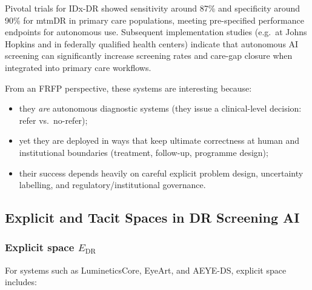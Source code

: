 Pivotal trials for IDx-DR showed sensitivity around 87\% and specificity
around 90\% for mtmDR in primary care populations, meeting pre-specified
performance endpoints for autonomous use.
Subsequent implementation studies (e.g.\ at Johns Hopkins and in federally
qualified health centers) indicate that autonomous AI screening can
significantly increase screening rates and care-gap closure when integrated
into primary care workflows.

From an FRFP perspective, these systems are interesting because:

\begin{itemize}
  \item they \emph{are} autonomous diagnostic systems (they issue a
        clinical-level decision: refer vs.\ no-refer);
  \item yet they are deployed in ways that keep ultimate correctness at
        human and institutional boundaries (treatment, follow-up, programme
        design);
  \item their success depends heavily on careful explicit problem design,
        uncertainty labelling, and regulatory/institutional governance.
\end{itemize}

\subsection{Explicit and Tacit Spaces in DR Screening AI}

\subsubsection*{Explicit space \(E_{\mathrm{DR}}\)}

For systems such as LumineticsCore, EyeArt, and AEYE-DS, explicit space
includes:

